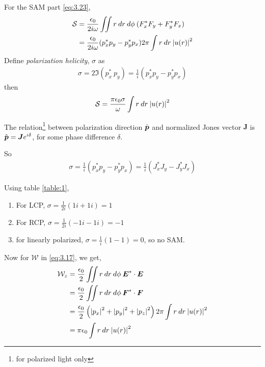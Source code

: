 \documentclass[11pt,a4paper]{article}
\numberwithin{equation}{section}
\begin{document}
For the SAM part \ref{eq:3.23},
\begin{align}
	\mathcal{S} &= \frac{\epsilon_0}{2i\omega}\iint r\:dr\:d\phi\: (F_x^\ast F_y + F_y^\ast F_x)\nonumber\\
	&=\frac{\epsilon_0}{2i\omega} (p_x^\ast p_y- p_y^\ast p_x)2\pi \int r\:dr\: \abs{u(r)}^2
\end{align}
Define \textit{polarization helicity}, $\sigma$ as 
\begin{align}
	\sigma = 2\Im(p_x^\ast\: p_y) = \frac{1}{i} (p_x^\ast p_y- p_y^\ast p_x)
\end{align}
then
\begin{align}
	\mathcal{S}
	=\frac{\pi\epsilon_0\sigma }{\omega}\int r\:dr\: \abs{u(r)}^2 \label{eq:3.28}
\end{align}

The relation\footnote{for polarized light only} between polarization direction $\Hat{\boldsymbol{p}}$ and normalized Jones vector $\boldsymbol{J}$ is $\Hat{\boldsymbol{p}} = \boldsymbol{J} e^{i\delta}$, for some phase difference $\delta$.

So
\begin{align}
	\sigma = \frac{1}{i}(p_x^\ast p_y- p_y^\ast p_x)
	=\frac{1}{i}(J_x^\ast J_y- J_y^\ast J_x)
\end{align}

Using table \ref{table:1},
\begin{enumerate}
	\item For LCP, $\sigma = \frac{1}{2i}(1i+1i)=1$
	\item For RCP, $\sigma = \frac{1}{2i}(-1i-1i)=-1$
	\item for linearly polarized, $\sigma = \frac{1}{i}(1-1)=0$, so no SAM.
\end{enumerate}

Now for $\mathcal{W}$ in \ref{eq:3.17}, we get,
\begin{align}
	\mathcal{W}_z &=\frac{\epsilon_0}{2}\iint r\:dr\:d\phi\: \boldsymbol{E}^\ast\cdot\boldsymbol{E}\nonumber\\
	&= \frac{\epsilon_0}{2}\iint r\:dr\:d\phi\: \boldsymbol{F}^\ast\cdot\boldsymbol{F}\nonumber\\
	&=\frac{\epsilon_0}{2} \left(\abs{p_x}^2+\abs{p_y}^2+\abs{p_z}^2\right) 2\pi\int r\:dr\:\abs{u(r)}^2\nonumber\\
	&=\pi\epsilon_0\int r\:dr\:\abs{u(r)}^2 \label{eq:3.31}
\end{align}
\end{document}

